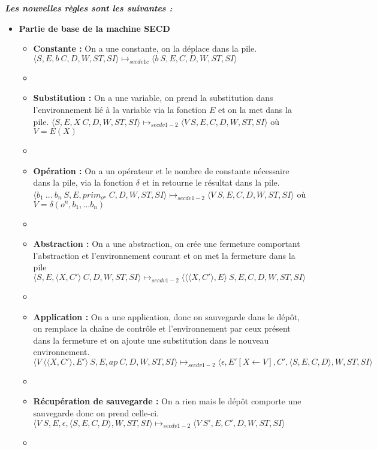 \documentclass[10pt,a4paper]{report}
\begin{document}
	
	\textbf{\textit{Les nouvelles règles sont les suivantes :}}
	\smallbreak
	\begin{itemize}
		\item[] \textbf{Partie de base de la machine SECD}
		\begin{itemize}
			\item[] \textbf{Constante :} On a une constante, on la déplace dans la pile. 
			\smallbreak
			$\langle S,E,b~C,D,W,ST,SI\rangle 
			\longmapsto_{secdv1c} 
			\langle b~S,E,C,D,W,ST,SI\rangle$
			\item[]
			
			\item[] \textbf{Substitution :} On a une variable, on prend la substitution dans l'environnement lié à la variable via la fonction $E$ et on la met dans la pile.  
			\smallbreak 
			$\langle S,E,X~C,D,W,ST,SI\rangle 
			\longmapsto_{secdv1-2} 
			\langle V~S,E,C,D,W,ST,SI\rangle$ 
			où $V = E(X)$
			\item[]
			
			\item[] \textbf{Opération :} On a un opérateur et le nombre de constante nécessaire dans la pile, via la fonction $\delta$ et in retourne le résultat dans la pile. 
			\smallbreak
			$\langle b_{1}~...~b_{n}~S,E,prim_{o^{n}}~C,D,W,ST,SI\rangle 
			\longmapsto_{secdv1-2} 
			\langle V~S,E,C,D,W,ST,SI\rangle$ 
			où $V = \delta(o^{n},b_1,...b_{n})$
			\item[]
			
			\item[] \textbf{Abstraction :} On a une abstraction, on crée une fermeture comportant l'abstraction et l'environnement courant et on met la fermeture dans la pile
			\smallbreak
			$\langle S,E,\langle X,C'\rangle~C,D,W,ST,SI\rangle 
			\longmapsto_{secdv1-2} 
			\langle\langle\langle X,C'\rangle,E\rangle~S,E,C,D,W,ST,SI\rangle$
			\item[]
			
			\item[] \textbf{Application :} On a une application, donc on sauvegarde dans le dépôt, on remplace la chaîne de contrôle et l'environnement par ceux présent dans la fermeture et on ajoute une substitution dans le nouveau environnement.
			\smallbreak
			$\langle V~\langle\langle X,C'\rangle,E'\rangle~S,E,ap~C,D,W,ST,SI\rangle 
			\longmapsto_{secdv1-2} 
			\langle\epsilon,E'[X \leftarrow V],C',\langle S,E,C,D\rangle,W,ST,SI\rangle$
			\item[]
			
			\item[] \textbf{Récupération de sauvegarde :} On a rien mais le dépôt comporte une sauvegarde donc on prend celle-ci.
			\smallbreak
			$\langle V~S,E,\epsilon,\langle S,E,C,D\rangle,W,ST,SI\rangle 
			\longmapsto_{secdv1-2} 
			\langle V~S',E,C',D,W,ST,SI\rangle$
			\item[]
			

\end{itemize}
\end{itemize}
\end{document}
